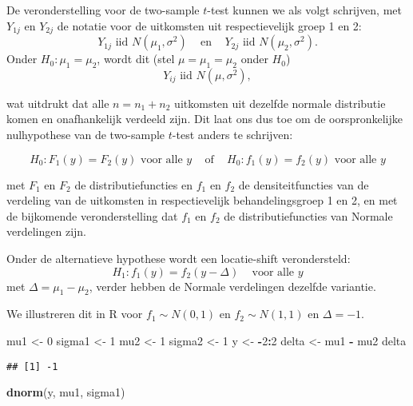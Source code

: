\documentclass[12pt,dutch,coursenotes]{book}
\newenvironment{Shaded}{\begin{snugshade}}{\end{snugshade}}
\newcommand{\KeywordTok}[1]{\textcolor[rgb]{0.13,0.29,0.53}{\textbf{#1}}}
\newcommand{\DecValTok}[1]{\textcolor[rgb]{0.00,0.00,0.81}{#1}}
\newcommand{\StringTok}[1]{\textcolor[rgb]{0.31,0.60,0.02}{#1}}
\newcommand{\OperatorTok}[1]{\textcolor[rgb]{0.81,0.36,0.00}{\textbf{#1}}}
\newcommand{\NormalTok}[1]{#1}
\theoremstyle{definition}
\theoremstyle{definition}
\theoremstyle{definition}
\theoremstyle{remark}
\begin{document}
De veronderstelling voor de two-sample \(t\)-test kunnen we als volgt
schrijven, met \(Y_{1j}\) en \(Y_{2j}\) de notatie voor de uitkomsten
uit respectievelijk groep 1 en 2:
\[Y_{1j} \text{ iid } N(\mu_1,\sigma^2) \;\;\;\text{ en }\;\;\; Y_{2j} \text{ iid } N(\mu_2,\sigma^2).\]
Onder \(H_0:\mu_1=\mu_2\), wordt dit (stel \(\mu=\mu_1=\mu_2\) onder
\(H_0\)) \[ Y_{ij} \text{ iid } N(\mu,\sigma^2),\]

wat uitdrukt dat alle \(n=n_1+n_2\) uitkomsten uit dezelfde normale
distributie komen en onafhankelijk verdeeld zijn. Dit laat ons dus toe
om de oorspronkelijke nulhypothese van de two-sample \(t\)-test anders
te schrijven:

\begin{equation}
H_0: F_1(y) = F_2(y) \text{ voor alle } y \;\;\;\text{ of }\;\;\; H_0: f_1(y) = f_2(y) \text{ voor alle } y \label{eq:H0F1F2}
\end{equation}

met \(F_1\) en \(F_2\) de distributiefuncties en \(f_1\) en \(f_2\) de
densiteitfuncties van de verdeling van de uitkomsten in respectievelijk
behandelingsgroep 1 en 2, en met de bijkomende veronderstelling dat
\(f_1\) en \(f_2\) de distributiefuncties van Normale verdelingen zijn.

Onder de alternatieve hypothese wordt een locatie-shift verondersteld:
\[H_1: f_1(y)=f_2(y-\Delta) \;\;\;\text{ voor alle } y\] met
\(\Delta=\mu_1-\mu_2\), verder hebben de Normale verdelingen dezelfde
variantie.

We illustreren dit in R voor \(f_1\sim N(0,1)\) en \(f_2\sim N(1,1)\) en
\(\Delta=-1\).

\begin{Shaded}
\begin{Highlighting}[]
\NormalTok{mu1 <-}\StringTok{ }\DecValTok{0}
\NormalTok{sigma1 <-}\StringTok{ }\DecValTok{1}
\NormalTok{mu2 <-}\StringTok{ }\DecValTok{1}
\NormalTok{sigma2 <-}\StringTok{ }\DecValTok{1}
\NormalTok{y <-}\StringTok{ }\OperatorTok{-}\DecValTok{2}\OperatorTok{:}\DecValTok{2}
\NormalTok{delta <-}\StringTok{ }\NormalTok{mu1 }\OperatorTok{-}\StringTok{ }\NormalTok{mu2}
\NormalTok{delta}
\end{Highlighting}
\end{Shaded}

\begin{verbatim}
## [1] -1
\end{verbatim}

\begin{Shaded}
\begin{Highlighting}[]
\KeywordTok{dnorm}\NormalTok{(y, mu1, sigma1)}
\end{Highlighting}
\end{Shaded}
\end{document}
